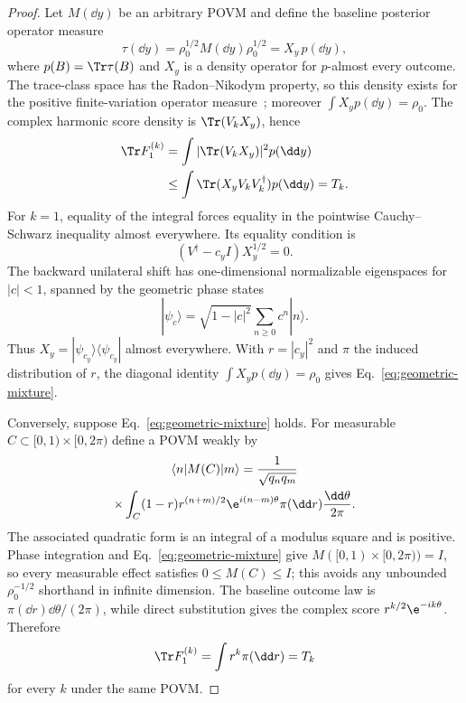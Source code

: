 \begin{proof}
Let $M(\dd y)$ be an arbitrary POVM and define the baseline posterior operator measure
\begin{equation}
 \tau(\dd y)=\rho_0^{1/2}M(\dd y)\rho_0^{1/2}
             =X_y\,p(\dd y),
 \label{eq:posterior-RN}
\end{equation}
where $p(B)=\Tr\tau(B)$ and $X_y$ is a density operator for $p$-almost every outcome.  The trace-class space has the Radon--Nikodym property, so this density exists for the positive finite-variation operator measure~\cite{FulscheGalke2025}; moreover $\int X_y p(\dd y)=\rho_0$.  The complex harmonic score density is $\Tr(V_kX_y)$, hence
\begin{align}
 \Tr F_1^{(k)}
 &=\int |\Tr(V_kX_y)|^2p(\dd y)\\
 &\leq\int\Tr(X_yV_kV_k^\dagger)p(\dd y)=T_k.
 \label{eq:posterior-bound}
\end{align}
For $k=1$, equality of the integral forces equality in the pointwise Cauchy--Schwarz inequality almost everywhere.  Its equality condition is
\begin{equation}
 (V^\dagger-c_y I)X_y^{1/2}=0.
 \label{eq:shift-equality}
\end{equation}
The backward unilateral shift has one-dimensional normalizable eigenspaces for $|c|<1$, spanned by the geometric phase states~\cite{FuSasaki1997}
\begin{equation}
 |\psi_c\rangle=\sqrt{1-|c|^2}\sum_{n\geq0}c^n|n\rangle.
 \label{eq:geometric-state}
\end{equation}
Thus $X_y=|\psi_{c_y}\rangle\langle\psi_{c_y}|$ almost everywhere.  With $r=|c_y|^2$ and $\pi$ the induced distribution of $r$, the diagonal identity $\int X_y p(\dd y)=\rho_0$ gives Eq.~\eqref{eq:geometric-mixture}.

Conversely, suppose Eq.~\eqref{eq:geometric-mixture} holds.  For measurable $C\subset[0,1)\times[0,2\pi)$ define a POVM weakly by
\begin{multline}
 \langle n|M(C)|m\rangle=\frac{1}{\sqrt{q_nq_m}}\\
 \times\int_C(1-r)r^{(n+m)/2}\e^{i(n-m)\theta}
 \pi(\dd r)\frac{\dd\theta}{2\pi}.
 \label{eq:mixture-POVM}
\end{multline}
The associated quadratic form is an integral of a modulus square and is positive.  Phase integration and Eq.~\eqref{eq:geometric-mixture} give $M([0,1)\times[0,2\pi))=I$, so every measurable effect satisfies $0\leq M(C)\leq I$; this avoids any unbounded $\rho_0^{-1/2}$ shorthand in infinite dimension.  The baseline outcome law is $\pi(\dd r)\dd\theta/(2\pi)$, while direct substitution gives the complex score $r^{k/2}\e^{-ik\theta}$.  Therefore
\begin{equation}
 \Tr F_1^{(k)}=\int r^k\pi(\dd r)=T_k
 \label{eq:allmode-mixture-equality}
\end{equation}
for every $k$ under the same POVM.


\end{proof}
